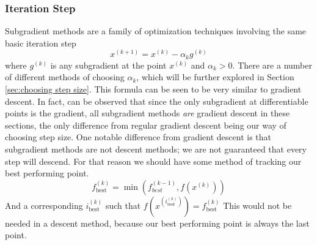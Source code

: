 \documentclass[journal,onecolumn]{IEEEtran}
\DeclareMathOperator{\best}{best}
\begin{document}
\subsubsection{Iteration Step}
Subgradient methods are a family of optimization techniques involving the same basic iteration step
\begin{equation}\label{eq:subgradient method iteration}
x^{(k+1)} = x^{(k)} - \alpha_k g^{(k)}
\end{equation}
where \(g^{(k)}\) is any subgradient at the point \(x^{(k)}\) and \(\alpha_k > 0\). There are a number of different methods of choosing \(\alpha_k\), which will be further explored in Section \ref{sec:choosing step size}. This formula can be seen to be very similar to gradient descent. In fact, can be observed that since the only subgradient at differentiable points is the gradient, all subgradient methods \textit{are} gradient descent in these sections, the only difference from regular gradient descent being our way of choosing step size. One notable difference from gradient descent is that subgradient methods are not descent methods; we are not guaranteed that every step will descend. For that reason we should have some method of tracking our best performing point.
\begin{equation}\label{eq:track best}
f^{(k)}_{\best} = \min (f^{(k-1)}_{best}, f(x^{(k)}))
\end{equation}
And a corresponding \(i^{(k)}_{\best}\) such that \(f(x^{(i^{(k)}_{\best})}) = f^{(k)}_{\best}\)
This would not be needed in a descent method, because our best performing point is always the last point.
\end{document}
